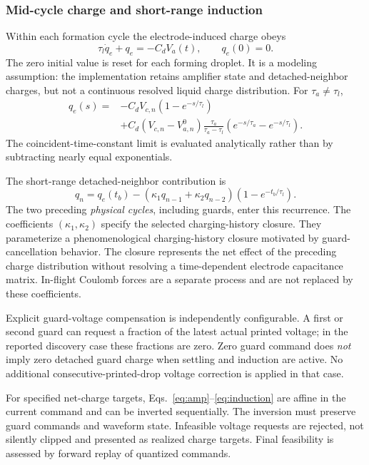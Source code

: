 \subsubsection{Mid-cycle charge and short-range induction}
Within each formation cycle the electrode-induced charge obeys
\begin{equation}
 \tau_l\dot q_e+q_e=-C_d V_a(t),\qquad q_e(0)=0.
\label{eq:liquid}
\end{equation}
The zero initial value is reset for each forming droplet. It is a modeling assumption: the implementation retains amplifier state and detached-neighbor charges, but not a continuous resolved liquid charge distribution. For $\tau_a\ne\tau_l$,
\begin{align}
 q_e(s)={}&-C_d V_{c,n}(1-e^{-s/\tau_l})\\
 &+C_d(V_{c,n}-V_{a,n}^{0})\frac{\tau_a}{\tau_a-\tau_l}
       (e^{-s/\tau_a}-e^{-s/\tau_l}).
\label{eq:charge_response}
\end{align}
The coincident-time-constant limit is evaluated analytically rather than by subtracting nearly equal exponentials.

The short-range detached-neighbor contribution is
\begin{equation}
 q_n=q_e(t_b)-\left(\kappa_1q_{n-1}+\kappa_2q_{n-2}\right)
                  (1-e^{-t_b/\tau_l}).
\label{eq:induction}
\end{equation}
The two preceding \emph{physical cycles}, including guards, enter this recurrence. The coefficients $(\kappa_1,\kappa_2)$ specify the selected charging-history closure. They parameterize a phenomenological charging-history closure motivated by guard-cancellation behavior. The closure represents the net effect of the preceding charge distribution without resolving a time-dependent electrode capacitance matrix. In-flight Coulomb forces are a separate process and are not replaced by these coefficients.

Explicit guard-voltage compensation is independently configurable. A first or second guard can request a fraction of the latest actual printed voltage; in the reported discovery case these fractions are zero. Zero guard command does \emph{not} imply zero detached guard charge when settling and induction are active. No additional consecutive-printed-drop voltage correction is applied in that case.

For specified net-charge targets, Eqs.~\eqref{eq:amp}--\eqref{eq:induction} are affine in the current command and can be inverted sequentially. The inversion must preserve guard commands and waveform state. Infeasible voltage requests are rejected, not silently clipped and presented as realized charge targets. Final feasibility is assessed by forward replay of quantized commands.

